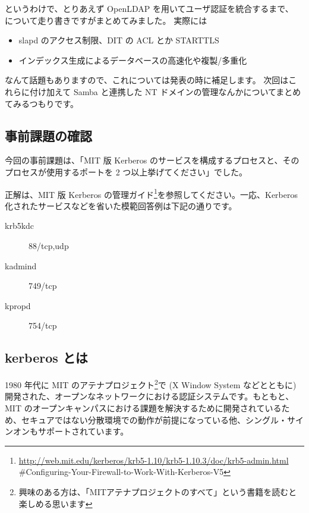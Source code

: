 \documentclass[mingoth,a4paper]{jsarticle}
\begin{document}
というわけで、とりあえず OpenLDAP を用いてユーザ認証を統合するまで、
について走り書きですがまとめてみました。
実際には
\begin{itemize}
\item slapd のアクセス制限、DIT の ACL とか STARTTLS
\item インデックス生成によるデータベースの高速化や複製/多重化
\end{itemize}
なんて話題もありますので、これについては発表の時に補足します。
次回はこれらに付け加えて
Samba と連携した NT ドメインの管理なんかについてまとめてみるつもりです。

\subsection{事前課題の確認}

今回の事前課題は、「MIT 版 Kerberos のサービスを構成するプロセスと、そのプロセスが使用するポートを 2 つ以上挙げてください」でした。

正解は、MIT 版 Kerberos の管理ガイド\footnote{\url{http://web.mit.edu/kerberos/krb5-1.10/krb5-1.10.3/doc/krb5-admin.html}\\
\#Configuring-Your-Firewall-to-Work-With-Kerberos-V5}を参照してください。一応、Kerberos 化されたサービスなどを省いた模範回答例は下記の通りです。

\begin{description}
\item [krb5kdc] 88/tcp,udp
\item [kadmind] 749/tcp
\item [kpropd] 754/tcp
\end{description}

\subsection{kerberos とは}

1980 年代に MIT のアテナプロジェクト\footnote{興味のある方は、「MITアテナプロジェクトのすべて」という書籍を読むと楽しめる思います}で (X Window System などとともに) 開発された、オープンなネットワークにおける認証システムです。もともと、MIT のオープンキャンパスにおける課題を解決するために開発されているため、セキュアではない分散環境での動作が前提になっている他、シングル・サインオンもサポートされています。
\end{document}
